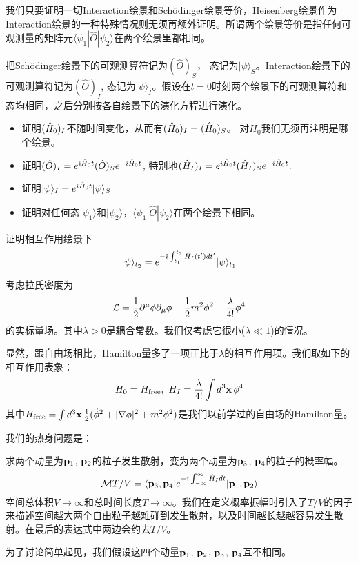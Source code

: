 \documentclass[CJK]{beamer}
\begin{document}
\begin{frame} 
\bch
{\small 
我们只要证明一切Interaction绘景和Sch\"odinger绘景等价，Heisenberg绘景作为Interaction绘景的一种特殊情况则无须再额外证明。所谓两个绘景等价是指任何可观测量的矩阵元$\langle \psi_1 | \hat{O}|\psi_2\rangle$在两个绘景里都相同。
\skipline

把Sch\"odinger绘景下的可观测算符记为$(\hat{O})_S$， 态记为$|\psi\rangle_S$。Interaction绘景下的可观测算符记为$(\hat{O})_I$, 态记为$|\psi\rangle_I$。假设在$t=0$时刻两个绘景下的可观测算符和态均相同，之后分别按各自绘景下的演化方程进行演化。
\begin{itemize}
\item{证明$({\hat{H}}_0)_I$不随时间变化，从而有$({\hat{H}}_0)_I=({\hat{H}}_0)_S$。 对$H_0$我们无须再注明是哪个绘景。}
\item{证明$(\hat{O})_I = e^{{\dot{\imath}}{\hat{H}}_0 t}(\hat{O})_S e^{-{\dot{\imath}}{\hat{H}}_0 t}$, 特别地$({\hat{H}}_I)_I= e^{{\dot{\imath}}{\hat{H}}_0 t}({\hat{H}}_I)_S e^{-{\dot{\imath}}{\hat{H}}_0 t}$.}
\item{证明$|\psi\rangle_I = e^{{\dot{\imath}}{\hat{H}}_0 t} |\psi\rangle_S $}
\item{证明对任何态$|\psi_1\rangle$和$|\psi_2\rangle$，$\langle \psi_1 | \hat{O}|\psi_2\rangle$在两个绘景下相同。}
\end{itemize}
}
\ech
\end{frame}

\begin{frame} 
\bch
证明相互作用绘景下
$$|\psi\rangle_{t_2} = e^{-{\dot{\imath}}\int_{t_1}^{t_2} {\hat{H}}_I(t') dt'} |\psi\rangle_{t_1}$$
\ech
\end{frame}


\begin{frame} 
\bch
考虑拉氏密度为
$${\mathcal{L}} = \frac{1}{2}\partial^\mu\phi\partial_\mu\phi - \frac{1}{2}m^2\phi^2 - \frac{\lambda}{4!}\phi^4$$
的实标量场。其中$\lambda>0$是耦合常数。我们仅考虑它很小($\lambda \ll 1$)的情况。

显然，跟自由场相比，Hamilton量多了一项正比于$\lambda$的相互作用项。我们取如下的相互作用表象：
$$ H_0 = H_{\rm free},\ H_I = \frac{\lambda}{4!} \int d^3{\mathbf{x}}\, \phi^4$$
其中$H_{\rm free} = \int d^3{\mathbf{x}}\, \frac{1}{2}(\dot\phi^2 + |\nabla \phi|^2 + m^2\phi^2)$是我们以前学过的自由场的Hamilton量。

\ech
\end{frame}

\begin{frame} 
\bch
我们的热身问题是：

求两个动量为${\mathbf{p}}_1$, ${\mathbf{p}}_2$的粒子发生散射，变为两个动量为${\mathbf{p}}_3$, ${\mathbf{p}}_4$的粒子的概率幅。
$${\mathcal{M}} T/V= \langle {\mathbf{p}}_3, {\mathbf{p}}_4|  e^{-{\dot{\imath}}\int_{-\infty}^\infty \hat{H}_I dt}|{\mathbf{p}}_1,{\mathbf{p}}_2\rangle$$
空间总体积$V\rightarrow \infty$和总时间长度$T\rightarrow \infty$。我们在定义概率振幅时引入了$T/V$的因子来描述空间越大两个自由粒子越难碰到发生散射，以及时间越长越越容易发生散射。在最后的表达式中两边会约去$T/V$。

为了讨论简单起见，我们假设这四个动量${\mathbf{p}}_1$, ${\mathbf{p}}_2$, ${\mathbf{p}}_3$, ${\mathbf{p}}_4$互不相同。
\ech
\end{frame}
\end{document}
